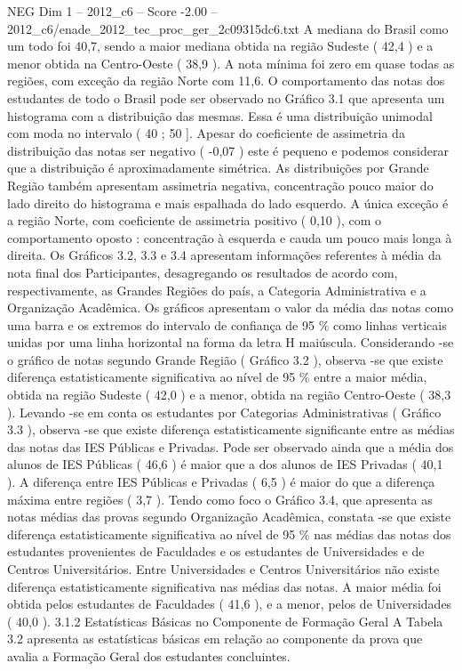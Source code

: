 \begin{textsample}{NEG Dim 1 – 2012\_c6 – Score -2.00 – 2012\_c6/enade\_2012\_tec\_proc\_ger\_2c09315dc6.txt}
A mediana do Brasil como um todo foi 40,7, sendo a maior mediana obtida na região Sudeste ( 42,4 ) e a menor obtida na Centro-Oeste ( 38,9 ).
A nota mínima foi zero em quase todas as regiões, com exceção da região Norte com 11,6.
O comportamento das notas dos estudantes de todo o Brasil pode ser observado no Gráfico 3.1 que apresenta um histograma com a distribuição das mesmas.
Essa é uma distribuição unimodal com moda no intervalo ( 40 ; 50 ].
Apesar do coeficiente de assimetria da distribuição das notas ser negativo ( -0,07 ) este é pequeno e podemos considerar que a distribuição é aproximadamente simétrica.
As distribuições por Grande Região também apresentam assimetria negativa, concentração pouco maior do lado direito do histograma e mais espalhada do lado esquerdo.
A única exceção é a região Norte, com coeficiente de assimetria positivo ( 0,10 ), com o comportamento oposto : concentração à esquerda e cauda um pouco mais longa à direita.
Os Gráficos 3.2, 3.3 e 3.4 apresentam informações referentes à média da nota final dos Participantes, desagregando os resultados de acordo com, respectivamente, as Grandes Regiões do país, a Categoria Administrativa e a Organização Acadêmica.
Os gráficos apresentam o valor da média das notas como uma barra e os extremos do intervalo de confiança de 95 \% como linhas verticais unidas por uma linha horizontal na forma da letra H maiúscula.
Considerando -se o gráfico de notas segundo Grande Região ( Gráfico 3.2 ), observa -se que existe diferença estatisticamente significativa ao nível de 95 \% entre a maior média, obtida na região Sudeste ( 42,0 ) e a menor, obtida na região Centro-Oeste ( 38,3 ).
Levando -se em conta os estudantes por Categorias Administrativas ( Gráfico 3.3 ), observa -se que existe diferença estatisticamente significante entre as médias das notas das IES Públicas e Privadas.
Pode ser observado ainda que a média dos alunos de IES Públicas ( 46,6 ) é maior que a dos alunos de IES Privadas ( 40,1 ).
A diferença entre IES Públicas e Privadas ( 6,5 ) é maior do que a diferença máxima entre regiões ( 3,7 ).
Tendo como foco o Gráfico 3.4, que apresenta as notas médias das provas segundo Organização Acadêmica, constata -se que existe diferença estatisticamente significativa ao nível de 95 \% nas médias das notas dos estudantes provenientes de Faculdades e os estudantes de Universidades e de Centros Universitários.
Entre Universidades e Centros Universitários não existe diferença estatisticamente significativa nas médias das notas.
A maior média foi obtida pelos estudantes de Faculdades ( 41,6 ), e a menor, pelos de Universidades ( 40,0 ). 3.1.2 Estatísticas Básicas no Componente de Formação Geral A Tabela 3.2 apresenta as estatísticas básicas em relação ao componente da prova que avalia a Formação Geral dos estudantes concluintes.

\end{textsample}
